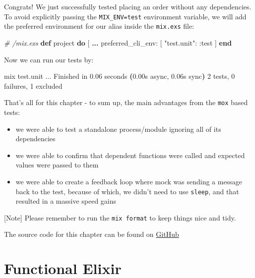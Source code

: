 \documentclass[
  oneside]{book}
\newenvironment{Shaded}{\begin{snugshade}}{\end{snugshade}}
\newcommand{\CommentTok}[1]{\textcolor[rgb]{0.56,0.35,0.01}{\textit{#1}}}
\newcommand{\ErrorTok}[1]{\textcolor[rgb]{0.64,0.00,0.00}{\textbf{#1}}}
\newcommand{\ExtensionTok}[1]{#1}
\newcommand{\KeywordTok}[1]{\textcolor[rgb]{0.13,0.29,0.53}{\textbf{#1}}}
\newcommand{\NormalTok}[1]{#1}
\newcommand{\OperatorTok}[1]{\textcolor[rgb]{0.81,0.36,0.00}{\textbf{#1}}}
\newcommand{\OtherTok}[1]{\textcolor[rgb]{0.56,0.35,0.01}{#1}}
\newcommand{\StringTok}[1]{\textcolor[rgb]{0.31,0.60,0.02}{#1}}
\newcommand{\VariableTok}[1]{\textcolor[rgb]{0.00,0.00,0.00}{#1}}
\providecommand{\tightlist}{%
  \setlength{\itemsep}{0pt}\setlength{\parskip}{0pt}}
\begin{document}
Congrats! We just successfully tested placing an order without any dependencies. To avoid explicitly passing the \texttt{MIX\_ENV=test} environment variable, we will add the preferred environment for our alias inside the \texttt{mix.exs} file:

\begin{Shaded}
\begin{Highlighting}[]
\CommentTok{\# /mix.exs}
  \KeywordTok{def}\NormalTok{ project }\KeywordTok{do}
    \OtherTok{[}
      \OperatorTok{...}
      \VariableTok{preferred\_cli\_env:} \OtherTok{[}
        \StringTok{"test.unit"}\NormalTok{: }\VariableTok{:test}
      \OtherTok{]}
  \KeywordTok{end}
\end{Highlighting}
\end{Shaded}

Now we can run our tests by:

\begin{Shaded}
\begin{Highlighting}[]
\ExtensionTok{mix}\NormalTok{ test.unit}
\ExtensionTok{...}
\ExtensionTok{Finished}\NormalTok{ in 0.06 seconds }\ErrorTok{(}\ExtensionTok{0.00s}\NormalTok{ async, 0.06s sync}\KeywordTok{)}
\ExtensionTok{2}\NormalTok{ tests, 0 failures, 1 excluded}
\end{Highlighting}
\end{Shaded}

That's all for this chapter - to sum up, the main advantages from the \texttt{mox} based tests:

\begin{itemize}
\tightlist
\item
  we were able to test a standalone process/module ignoring all of its dependencies
\item
  we were able to confirm that dependent functions were called and expected values were passed to them
\item
  we were able to create a feedback loop where mock was sending a message back to the test, because of which, we didn't need to use \texttt{sleep}, and that resulted in a massive speed gains
\end{itemize}

{[}Note{]} Please remember to run the \texttt{mix\ format} to keep things nice and tidy.

The source code for this chapter can be found on \href{https://github.com/Cinderella-Man/hands-on-elixir-and-otp-cryptocurrency-trading-bot-source-code/tree/chapter_17}{GitHub}

\chapter{Functional Elixir}\label{functional-elixir}
\end{document}

